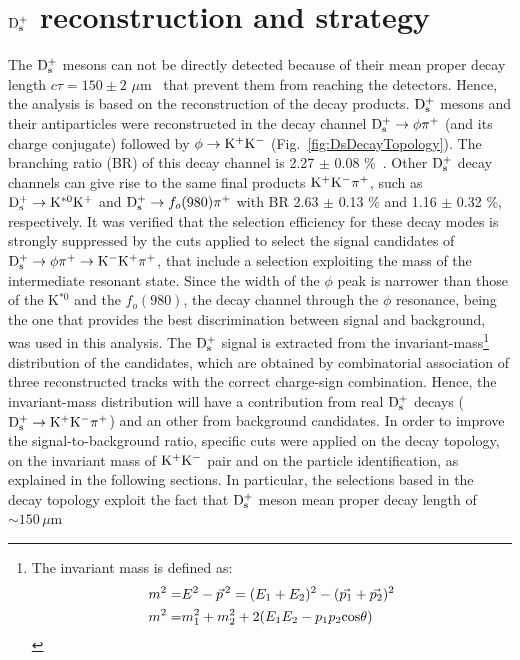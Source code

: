 \section{${\rm D_s^+}$ reconstruction and strategy}
\label{sec:DsRecoStrategy}
The ${\rm D_s^+}$ mesons can not be directly detected because of 
their mean proper decay length $c\tau = 150\pm 2$ $ \mu$m~\cite{Olive:2016xmw} 
that prevent them from reaching the detectors. Hence, the analysis is 
based on the reconstruction of the decay products.
${\rm D_s^+}$ mesons and their antiparticles were 
 reconstructed in the decay channel ${\rm D_s^{+}\to \phi\pi^+}$ 
 (and its charge conjugate) followed by ${\phi \to {\rm K^+ K^-}}$ 
 (Fig.~\ref{fig:DsDecayTopology}). The branching ratio (BR) of this decay channel 
 is 2.27 $\pm$ 0.08 \%~\cite{Olive:2016xmw}.
Other ${\rm D_s^+}$ decay channels can give rise to the same final products
 ${\rm K^+ K^-}\pi^+$, such as ${\rm D_s^+}\rightarrow {\rm  K^{*0} K^+}$ and 
 ${\rm D_s^+}\rightarrow f_o(980) \pi^+$ with BR  2.63 $\pm$ 0.13 \% and 
 1.16 $\pm$ 0.32 \%, respectively. It was verified that the selection efficiency for 
 these decay modes is strongly suppressed by the cuts applied 
 to select the signal candidates of ${\rm D_s^{+}\to \phi\pi^+\to K^-K^+\pi^+}$, that include 
 a selection exploiting the mass of the intermediate resonant state. 
 Since the width of the $\phi$ peak is narrower than those of the 
 K$^{*0}$ and the $f_o(980)$, the decay channel through the 
 $\phi$ resonance, being the one that provides the best discrimination 
 between signal and background, was used in this analysis. 
 The ${\rm D_s^+}$ signal is extracted from 
 the invariant-mass\footnote{The invariant mass is defined as:\\ 
 \begin{align*} m^2 =& E^2 -\vec{p}^{\, 2} = (E_1 + E_2)^2 -(\vec{p_1} + \vec{p_2})^2 \\ m^2 =& m_1^2 +m_2^2 + 2(E_1E_2 -p_1p_2{\rm cos}\theta) \end{align*}} 
 distribution of the candidates, which are obtained by 
 combinatorial association of three reconstructed tracks with the correct 
 charge-sign combination. Hence, 
 the invariant-mass distribution will have a contribution from real 
 ${\rm D_s^+}$ decays (${\rm D^{+}_\mathrm{s}\to K^+ K^-\pi^+}$) and an other 
 from background candidates. In order to improve the signal-to-background
ratio, specific cuts were applied on the decay topology, on
   the invariant mass of ${\rm K^+ K^-}$ pair and on the particle identification, 
   as explained in the following sections. 
In particular, the selections based in the decay topology exploit the
fact that ${\rm D_s^+}$ meson mean proper decay length of $\sim 150\, \mu$m  
